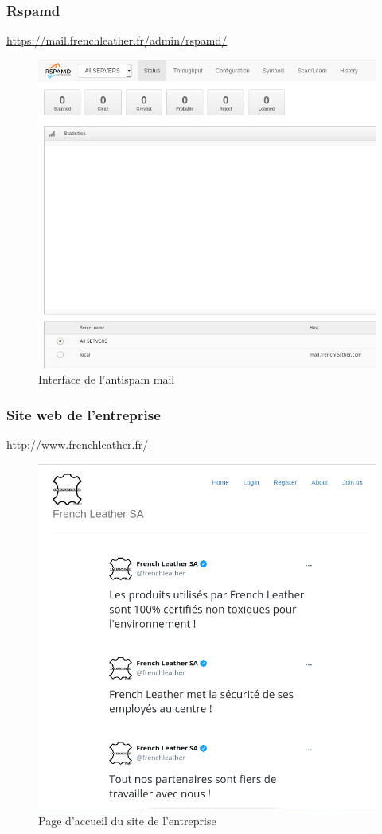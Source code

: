 \documentclass{beamer}
\begin{document}
		\begin{frame}
			\frametitle{Rspamd}
			\url{https://mail.frenchleather.fr/admin/rspamd/}
			\begin{center}
				\begin{figure}
					\includegraphics[scale=.23]{rspamd.png}
					\caption{Interface de l'antispam mail}
				\end{figure}
			\end{center}
		\end{frame}
		\begin{frame}
			\frametitle{Site web de l'entreprise}
			\url{http://www.frenchleather.fr/}
			\begin{center}
				\begin{figure}
					\includegraphics[scale=.22]{www.png}
					\caption{Page d'accueil du site de l'entreprise}
				\end{figure}
			\end{center}
		\end{frame}
\end{document}
